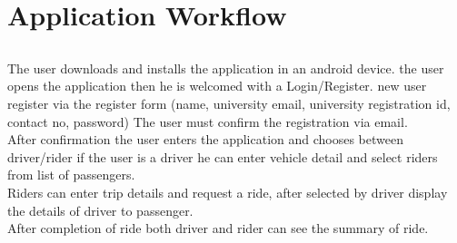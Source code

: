 \chapter{Application Workflow} \label{ap:Appendix1}

\section*{}
The user downloads and installs the application in an android device. the user opens the application then he is welcomed with a Login/Register. new user register via the register form (name, university email, university registration id, contact no, password) The user must confirm the registration via email.
\\ After confirmation the user enters the application and chooses between driver/rider if the user is a driver he can enter vehicle detail and select riders from list of passengers.
\\ Riders can enter trip details and request a ride, after selected by driver display the details of driver to passenger. 
\\ After completion of ride both driver and rider can see the summary of ride.

